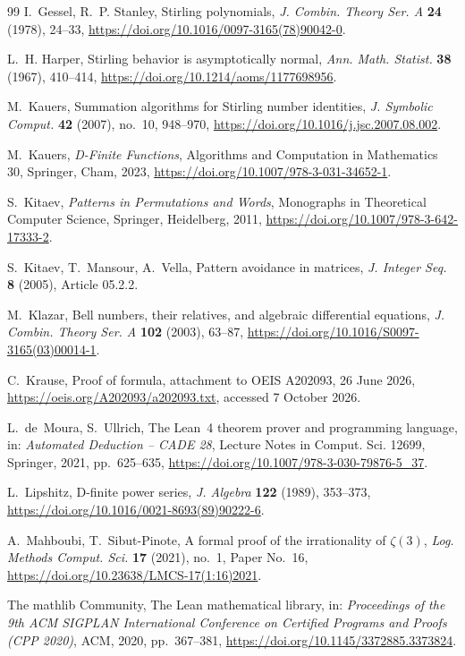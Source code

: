 \documentclass[11pt]{amsart}
\theoremstyle{definition}
\begin{document}
\begin{thebibliography}{99}
I.~Gessel, R.~P. Stanley, Stirling polynomials, \emph{J. Combin. Theory Ser. A} \textbf{24} (1978), 24--33, \url{https://doi.org/10.1016/0097-3165(78)90042-0}.

L.~H. Harper, Stirling behavior is asymptotically normal, \emph{Ann. Math. Statist.} \textbf{38} (1967), 410--414, \url{https://doi.org/10.1214/aoms/1177698956}.

M.~Kauers, Summation algorithms for Stirling number identities, \emph{J. Symbolic Comput.} \textbf{42} (2007), no.~10, 948--970, \url{https://doi.org/10.1016/j.jsc.2007.08.002}.

M.~Kauers, \emph{D-Finite Functions}, Algorithms and Computation in Mathematics 30, Springer, Cham, 2023, \url{https://doi.org/10.1007/978-3-031-34652-1}.

S.~Kitaev, \emph{Patterns in Permutations and Words}, Monographs in Theoretical Computer Science, Springer, Heidelberg, 2011, \url{https://doi.org/10.1007/978-3-642-17333-2}.

S.~Kitaev, T.~Mansour, A.~Vella, Pattern avoidance in matrices, \emph{J. Integer Seq.} \textbf{8} (2005), Article 05.2.2.

M.~Klazar, Bell numbers, their relatives, and algebraic differential equations, \emph{J. Combin. Theory Ser. A} \textbf{102} (2003), 63--87, \url{https://doi.org/10.1016/S0097-3165(03)00014-1}.

C.~Krause, Proof of formula, attachment to OEIS A202093, 26 June 2026, \url{https://oeis.org/A202093/a202093.txt}, accessed 7 October 2026.

L.~de~Moura, S.~Ullrich, The Lean~4 theorem prover and programming language, in: \emph{Automated Deduction -- CADE 28}, Lecture Notes in Comput. Sci. 12699, Springer, 2021, pp.~625--635, \url{https://doi.org/10.1007/978-3-030-79876-5_37}.

L.~Lipshitz, D-finite power series, \emph{J. Algebra} \textbf{122} (1989), 353--373, \url{https://doi.org/10.1016/0021-8693(89)90222-6}.

A.~Mahboubi, T.~Sibut-Pinote, A formal proof of the irrationality of $\zeta(3)$, \emph{Log. Methods Comput. Sci.} \textbf{17} (2021), no.~1, Paper No.~16, \url{https://doi.org/10.23638/LMCS-17(1:16)2021}.

The mathlib Community, The Lean mathematical library, in: \emph{Proceedings of the 9th ACM SIGPLAN International Conference on Certified Programs and Proofs (CPP 2020)}, ACM, 2020, pp.~367--381, \url{https://doi.org/10.1145/3372885.3373824}.


\end{thebibliography}
\end{document}
